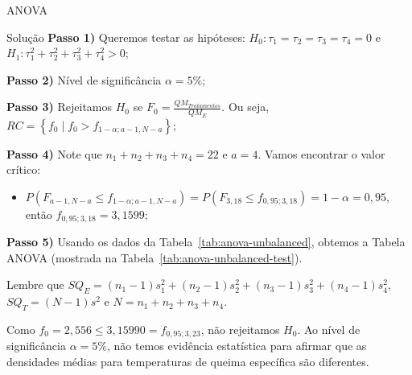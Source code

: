 \documentclass[8pt]{beamer}
\begin{document}
\begin{frame}{ANOVA}

\small
\begin{block}{Solução}
	\textbf{Passo 1)} Queremos testar as hipóteses: $H_0: \tau_1 = \tau_2 = \tau_3 = \tau_4 = 0$ e $H_1: \tau_1^2 +  \tau_2^2 +  \tau_3^2 + \tau_4^2 > 0$;
	
	\textbf{Passo 2)} Nível de significância $\alpha=5\%$;
	
	\textbf{Passo 3)} Rejeitamos $H_0$ se $F_0 = \frac{QM_{Tratamentos}}{QM_E}$. Ou seja, $RC = \left\{ f_0 \mid f_0 > f_{1-\alpha;a-1, N-a} \right\} $;
	
	\textbf{Passo 4)} Note que $n_1+n_2+n_3+n_4=22$ e $a = 4$. Vamos encontrar o valor crítico:
	\begin{itemize}
		\item $P\left( F_{a-1, N-a} \leq f_{1-\alpha;a-1, N-a} \right) = P\left( F_{3, 18} \leq f_{0,95;3, 18} \right) = 1- \alpha = 0,95$, então $f_{0,95;3, 18} = 3,1599$;
	\end{itemize}

	\textbf{Passo 5)} Usando os dados da Tabela~\ref{tab:anova-unbalanced}, obtemos a Tabela ANOVA (mostrada na Tabela~\ref{tab:anova-unbalanced-test}).
	\begin{table}[ht]
		\centering
		\caption{Tabela Anova} 
		\label{tab:anova-unbalanced-test}
	\end{table}
	Lembre que $SQ_{E} = (n_1-1) s_1^2 + (n_2-1) s_2^2 + (n_3-1) s_3^2 + (n_4-1) s_4^2$, $SQ_T = (N-1)s^2$ e $N = n_1+n_2+n_3+n_4$.

	Como $f_0 = 2, 556 \leq 3,15990 = f_{0,95; 3, 23}$, não rejeitamos $H_0$. Ao nível de significância $\alpha=5\%$, não temos evidência estatística para afirmar que as densidades médias para temperaturas de queima específica são diferentes.
\end{block}
\normalsize

\end{frame}
\end{document}
